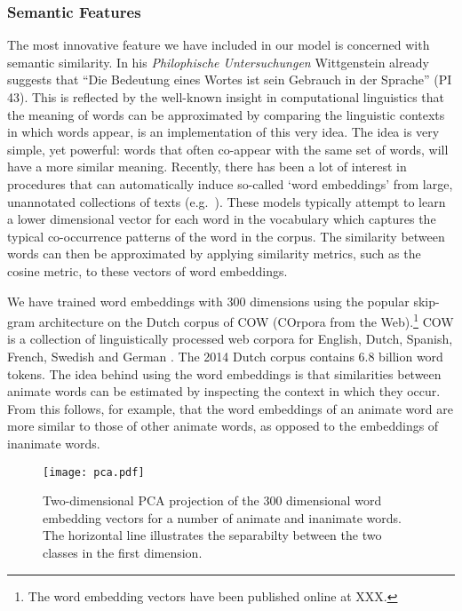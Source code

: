 \documentclass[a4paper,UKenglish]{oasics}
\begin{document}
\subsubsection{Semantic Features} 
The most innovative feature we have
included in our model is concerned with semantic similarity. In his
\textit{Philophische Untersuchungen} Wittgenstein already suggests
that ``Die Bedeutung eines Wortes ist sein Gebrauch in der Sprache''
(PI 43). This is reflected by the well-known insight in computational linguistics that the
meaning of words can be approximated by comparing the linguistic
contexts in which words appear, is an implementation of this very
idea. The idea is very simple, yet powerful: words that often
co-appear with the same set of words, will have a more similar
meaning. Recently, there has been a lot of interest in procedures that
can automatically induce so-called `word embeddings' from large,
unannotated collections of texts
(e.g.~\cite{mikolov:13,pennington:14}). These models typically attempt
to learn a lower dimensional vector for each word in the vocabulary
which captures the typical co-occurrence patterns of the word in the
corpus. The similarity between words can then be approximated by
applying similarity metrics, such as the cosine metric, to these
vectors of word embeddings.

We have trained word embeddings with 300 dimensions using the popular
skip-gram architecture \cite{mikolov:13} on the Dutch corpus of COW
(COrpora from the Web).\footnote{The word embedding vectors have been
  published online at XXX.} COW is a collection of linguistically
processed web corpora for English, Dutch, Spanish, French, Swedish and
German \cite{schaefer:12}. The 2014 Dutch corpus contains 6.8 billion
word tokens. The idea behind using the word embeddings is that
similarities between animate words can be estimated by inspecting the
context in which they occur. From this follows, for example, that the word
embeddings of an animate word are more similar to those of other
animate words, as opposed to the embeddings of inanimate words.

\begin{figure}[t]
\centering
\texttt{[image: pca.pdf]}
\caption{Two-dimensional PCA projection of the 300 dimensional word embedding
vectors for a number of animate and inanimate words. The horizontal line
illustrates the separabilty between the two classes in the first dimension.}
\label{fig:pca}
\end{figure}
\end{document}
